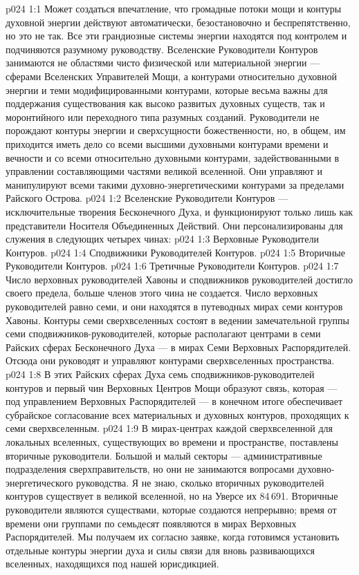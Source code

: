 \vs p024 1:1 Может создаться впечатление, что громадные потоки мощи и контуры духовной энергии действуют автоматически, безостановочно и беспрепятственно, но это не так. Все эти грандиозные системы энергии находятся под контролем и подчиняются разумному руководству. Вселенские Руководители Контуров занимаются не областями чисто физической или материальной энергии --- сферами Вселенских Управителей Мощи, а контурами относительно духовной энергии и теми модифицированными контурами, которые весьма важны для поддержания существования как высоко развитых духовных существ, так и моронтийного или переходного типа разумных созданий. Руководители не порождают контуры энергии и сверхсущности божественности, но, в общем, им приходится иметь дело со всеми высшими духовными контурами времени и вечности и со всеми относительно духовными контурами, задействованными в управлении составляющими частями великой вселенной. Они управляют и манипулируют всеми такими духовно\hyp{}энергетическими контурами за пределами Райского Острова.
\vs p024 1:2 \pc Вселенские Руководители Контуров --- исключительные творения Бесконечного Духа, и функционируют только лишь как представители Носителя Объединенных Действий. Они персонализированы для служения в следующих четырех чинах:
\vs p024 1:3 \bibnobreakspace Верховные Руководители Контуров.
\vs p024 1:4 \bibnobreakspace Сподвижники Руководителей Контуров.
\vs p024 1:5 \bibnobreakspace Вторичные Руководители Контуров.
\vs p024 1:6 \bibnobreakspace Третичные Руководители Контуров.
\vs p024 1:7 \pc Число верховных руководителей Хавоны и сподвижников руководителей достигло своего предела, больше членов этого чина не создается. Число верховных руководителей равно семи, и они находятся в путеводных мирах семи контуров Хавоны. Контуры семи сверхвселенных состоят в ведении замечательной группы семи сподвижников\hyp{}руководителей, которые располагают центрами в семи Райских сферах Бесконечного Духа --- в мирах Семи Верховных Распорядителей. Отсюда они руководят и управляют контурами сверхвселенных пространства.
\vs p024 1:8 В этих Райских сферах Духа семь сподвижников\hyp{}руководителей контуров и первый чин Верховных Центров Мощи образуют связь, которая --- под управлением Верховных Распорядителей --- в конечном итоге обеспечивает субрайское согласование всех материальных и духовных контуров, проходящих к семи сверхвселенным.
\vs p024 1:9 В мирах\hyp{}центрах каждой сверхвселенной для локальных вселенных, существующих во времени и пространстве, поставлены вторичные руководители. Большой и малый секторы --- административные подразделения сверхправительств, но они не занимаются вопросами духовно\hyp{}энергетического руководства. Я не знаю, сколько вторичных руководителей контуров существует в великой вселенной, но на Уверсе их 84\,691. Вторичные руководители являются существами, которые создаются непрерывно; время от времени они группами по семьдесят появляются в мирах Верховных Распорядителей. Мы получаем их согласно заявке, когда готовимся установить отдельные контуры энергии духа и силы связи для вновь развивающихся вселенных, находящихся под нашей юрисдикцией.
